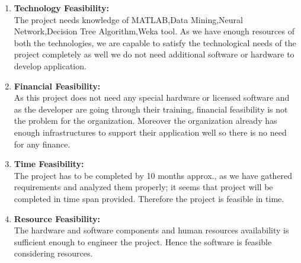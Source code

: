 \documentclass[a4paper,14pt,onecolumn]{article}
\begin{document}
  \begin{enumerate}
   \item \textbf{Technology Feasibility:}\\The project needs knowledge of MATLAB,Data Mining,Neural Network,Decision Tree Algorithm,Weka tool. As we have enough resources of both the technologies, we are capable to satisfy the technological needs of the project completely as well we do not need additional software or hardware to develop application.
   \item \textbf{Financial Feasibility:}\\As this project does not need any special hardware or licensed software and as the developer are going through their training, financial feasibility is not the problem for the organization. Moreover the organization already has enough infrastructures to support their application well so there is no need for any finance. 
   \item \textbf{Time Feasibility:}\\The project has to be completed by 10 months approx., as we have gathered requirements and analyzed them properly; it seems that project will be completed in time span provided. Therefore the project is feasible in time. 
   \item \textbf{Resource Feasibility:}\\The hardware and software components and human resources availability is sufficient enough to engineer the project. Hence the software is feasible considering resources.
   \end{enumerate}
\end{document}
